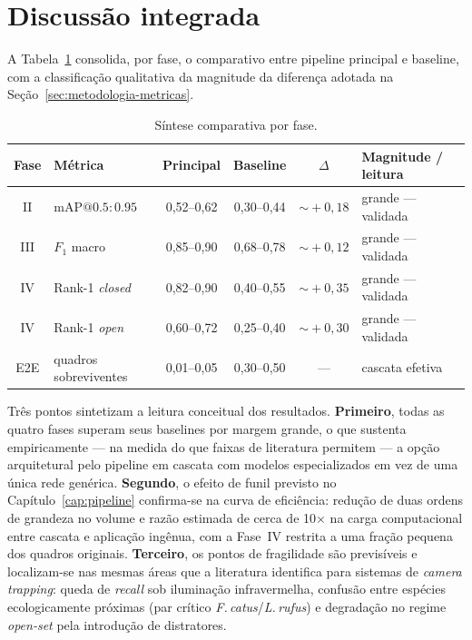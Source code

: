 \section{Discussão integrada}
\label{sec:resultados-discussao}

A Tabela~\ref{tab:res-sintese} consolida, por fase, o comparativo entre pipeline principal e baseline, com a classificação qualitativa da magnitude da diferença adotada na Seção~\ref{sec:metodologia-metricas}.

\begin{table}[!htb]
\centering
\caption{Síntese comparativa por fase. }
\label{tab:res-sintese}
\small
\begin{tabular}{@{}clcccl@{}}
\toprule
\textbf{Fase} & \textbf{Métrica} & \textbf{Principal} & \textbf{Baseline} & \textbf{$\Delta$} & \textbf{Magnitude / leitura} \\
\midrule
II   & mAP$@0.5{:}0.95$   & 0{,}52--0{,}62 & 0{,}30--0{,}44 & $\sim\!+0{,}18$ & grande --- validada \\
III  & $F_1$ macro        & 0{,}85--0{,}90 & 0{,}68--0{,}78 & $\sim\!+0{,}12$ & grande --- validada \\
IV   & Rank-1 \emph{closed} & 0{,}82--0{,}90 & 0{,}40--0{,}55 & $\sim\!+0{,}35$ & grande --- validada \\
IV   & Rank-1 \emph{open}   & 0{,}60--0{,}72 & 0{,}25--0{,}40 & $\sim\!+0{,}30$ & grande --- validada \\
E2E  & quadros sobreviventes & 0{,}01--0{,}05 & 0{,}30--0{,}50 & --- & cascata efetiva \\
\bottomrule
\end{tabular}
\end{table}

Três pontos sintetizam a leitura conceitual dos resultados. \textbf{Primeiro}, todas as quatro fases superam seus baselines por margem grande, o que sustenta empiricamente --- na medida do que faixas de literatura permitem --- a opção arquitetural pelo pipeline em cascata com modelos especializados em vez de uma única rede genérica. \textbf{Segundo}, o efeito de funil previsto no Capítulo~\ref{cap:pipeline} confirma-se na curva de eficiência: redução de duas ordens de grandeza no volume e razão estimada de cerca de 10$\times$ na carga computacional entre cascata e aplicação ingênua, com a Fase~IV restrita a uma fração pequena dos quadros originais. \textbf{Terceiro}, os pontos de fragilidade são previsíveis e localizam-se nas mesmas áreas que a literatura identifica para sistemas de \emph{camera trapping}: queda de \emph{recall} sob iluminação infravermelha, confusão entre espécies ecologicamente próximas (par crítico \emph{F.\,catus}/\emph{L.\,rufus}) e degradação no regime \emph{open-set} pela introdução de distratores.

